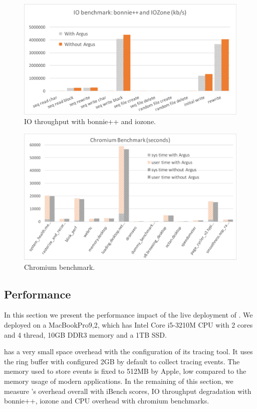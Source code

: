 \begin{figure}
\centering
\includegraphics[width=\columnwidth]{./figures/performance_io.pdf}
\caption{IO throughput with bonnie++ and iozone.}
\label{fig:iothroughput}
\end{figure}

\begin{figure}
	\centering
		\includegraphics[width=\columnwidth]{./figures/performance_cr.pdf}
	\caption{Chromium benchmark.}
	\label{fig:chromium benchmark}
\end{figure}


\subsection{Performance} \label{sec:evaluation}

In this section we present the performance impact of the live deployment of
\xxx. We deployed \xxx on a MacBookPro9,2, which has Intel Core i5-3210M CPU with
2 cores and 4 thread, 10GB DDR3 memory and a 1TB SSD.

\xxx has a very small space overhead with the configuration of its tracing
tool. It uses the ring buffer with configured 2GB by default to collect tracing
events. The memory used to store events is fixed to 512MB by Apple, 
low compared to the memory usage of modern applications. In the remaining
of this section, we measure \xxx's overhead overall with iBench scores, IO
throughput degradation with bonnie++, iozone and CPU overhead with chromium
benchmarks.

